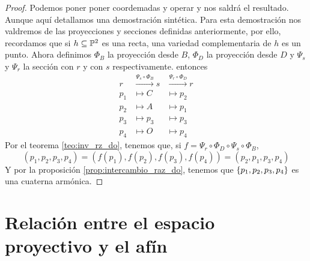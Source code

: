 \begin{teo}
\begin{center}
    \end{center}
\end{teo}

\begin{proof}
 Podemos poner poner coordemadas y operar y nos saldrá el resultado. Aunque aquí detallamos una demostración
 sintética. Para esta demostración nos valdremos de las proyecciones y secciones definidas anteriormente, por
 ello, recordamos que si $h \subseteq \mathbb{P}^2$ es una recta, una variedad complementaria de $h$ es un punto. Ahora
 definimos $\Phi_B$ la proyección desde $B$, $\Phi_D$ la proyección desde $D$ y $\Psi_s$ y $\Psi_r$ la sección
 con $r$ y con $s$ respectivamente. entonces
 \[
  \begin{array}{ccc}
   r & \stackrel{\Psi_s \circ \Phi_B}{\to} s & \stackrel{\Psi_r \circ \Phi_D}{\to} r \\
   p_1 &\mapsto C &\mapsto p_2 \\
   p_2 &\mapsto A &\mapsto p_1 \\
   p_3 &\mapsto p_3 &\mapsto p_3 \\
   p_4 &\mapsto O &\mapsto p_4
  \end{array}
 \]
 Por el teorema \ref{teo:inv_rz_do}, tenemos que, si $f = \Psi_r \circ \Phi_D \circ \Psi_s \circ \Phi_B$,
 \[
  (p_1,p_2,p_3,p_4) = \left( f(p_1), f(p_2), f(p_3), f(p_4) \right) = (p_2,p_1,p_3,p_4)
 \]
 Y por la proposición \ref{prop:intercambio_raz_do}, tenemos que $\left\{p_1,p_2,p_3,p_4\right\}$ es una cuaterna
 armónica.
\end{proof}


\section{Relación entre el espacio proyectivo y el afín}

